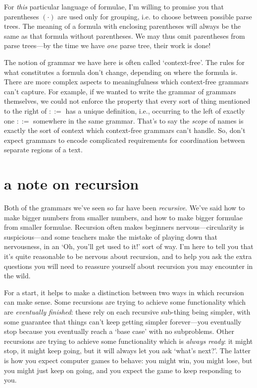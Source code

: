 \documentclass{book}
\begin{document}
For \emph{this} particular language of formulae, I'm willing to promise you that parentheses $(\cdot)$ are used only for grouping, i.e. to choose between possible parse trees. The meaning of a formula with enclosing parentheses will always be the same as that formula without parentheses. We may thus omit parentheses from parse trees---by the time we have \emph{one} parse tree, their work is done!

The notion of grammar we have here is often called `context-free'. The rules for what constitutes a formula don't change, depending on where the formula is. There are more complex aspects to meaningfulness which context-free grammars can't capture. For example, if we wanted to write the grammar of grammars themselves, we could not enforce the property that every sort of thing mentioned to the right of $::=$ has a unique definition, i.e., occurring to the left of exactly one $::=$ somewhere in the same grammar. That's to say the \emph{scope} of names is exactly the sort of context which context-free grammars can't handle. So, don't expect grammars to encode complicated requirements for coordination between separate regions of a text.


\section{a note on recursion}

Both of the grammars we've seen so far have been \emph{recursive}. We've said how to make bigger numbers from smaller numbers, and how to make bigger formulae from smaller formulae. Recursion often makes beginners nervous---circularity is suspicious---and some teachers make the mistake of playing down that nervousness, in an `Oh, you'll get used to it!' sort of way. I'm here to tell you that it's quite reasonable to be nervous about recursion, and to help you ask the extra questions you will need to reassure yourself about recursion you may encounter in the wild.

For a start, it helps to make a distinction between two ways in which recursion can make sense. Some recursions are trying to achieve some functionality which are \emph{eventually finished}: these rely on each recursive sub-thing being simpler, with some guarantee that things can't keep getting simpler forever---you eventually stop because you eventually reach a `base case' with no subproblems. Other recursions are trying to achieve some functionality which is \emph{always ready}: it might stop, it might keep going, but it will always let you ask `what's next?'. The latter is how you expect computer games to behave: you might win, you might lose, but you might just keep on going, and you expect the game to keep responding to you.
\end{document}

